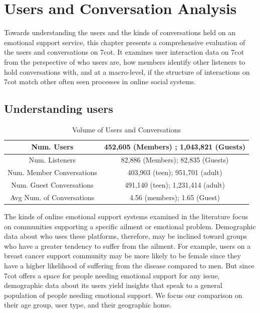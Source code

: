\chapter{Users and Conversation Analysis}
Towards understanding the users and the kinds of conversations held on an emotional
support service, this chapter presents a comprehensive evaluation of the users and conversations on 7cot. It examines user interaction data on 7cot from the 
perspective of who users are, how members identify other listeners to hold conversations
with, and at a macro-level, if the structure of interactions on 7cot match other often seen 
processes in online social systems. 

\section{Understanding users}

\begin{table}
	\centering
	\begin{tabular}{c | c} 
		Num. Users & 452,605 (Members) ; 1,043,821 (Guests) \\ 
		\hline
		Num. Listeners & 82,886 (Members); 82,835 (Guests)    \\
		\hline
		Num. Member Conversations &   403,903 (teen); 951,701 (adult)  \\
		\hline
		Num. Guest Conversations & 491,140 (teen);   1,231,414 (adult) \\
		\hline
		Avg Num. of Conversations & 4.56 (members); 1.65 (Guest)\\
	\end{tabular}
	\caption{Volume of Users and Conversations}
	\label{table 4.1}
	\end{table}

The kinds of online emotional support systems examined in the literature focus on communities supporting a specific ailment or emotional problem. Demographic data about who uses these platforms, therefore, may be inclined toward groups who have a greater tendency to suffer from the ailment. For example, users on a breast cancer support community may be more likely to be female since they have a higher likelihood of suffering from the disease compared to men. But since 7cot offers a space for people needing emotional support for any issue, demographic data about its users yield insights that speak to a general population of people needing emotional support. We focus our comparison on their age group, user type, and their geographic home. 

